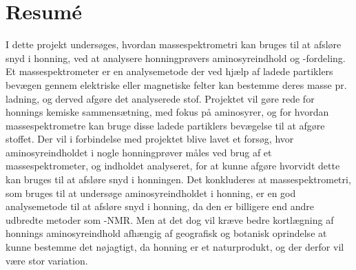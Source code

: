 \section*{Resumé}
I dette projekt undersøges, hvordan massespektrometri kan bruges til at afsløre snyd i honning, ved at analysere honningprøvers aminosyreindhold og -fordeling.
Et massespektrometer er en analysemetode der ved hjælp af ladede partiklers bevægen gennem elektriske eller magnetiske felter kan bestemme deres masse pr. ladning, og derved afgøre det analyserede stof.
Projektet vil gøre rede for honnings kemiske sammensætning, med fokus på aminosyrer, og for hvordan massespektrometre kan bruge disse ladede partiklers bevægelse til at afgøre stoffet.
Der vil i forbindelse med projektet blive lavet et forsøg, hvor aminosyreindholdet i nogle honningprøver måles ved brug af et massespektrometer,
og indholdet analyseret, for at kunne afgøre hvorvidt dette kan bruges til at afsløre snyd i honningen.
\newline Det konkluderes at massespektrometri, som bruges til at undersøge aminosyreindholdet i honning, er en god analysemetode til at afsløre snyd i honning,
da den er billigere end andre udbredte metoder som -NMR.
Men at det dog vil kræve bedre kortlægning af honnings aminosyreindhold afhængig af geografisk og botanisk oprindelse at kunne bestemme det nøjagtigt,
da honning er et naturprodukt, og der derfor vil være stor variation.
